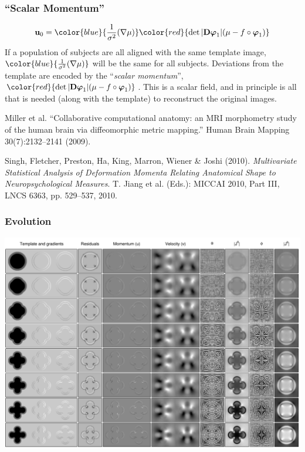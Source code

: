 \begin{frame}
\frametitle{``Scalar Momentum''}
\begin{eqnarray*}
{\bf u}_{0} = \color{blue}{\frac{1}{\sigma^2} (\nabla \mu)} \color{red}{\det | {\bf D}{\boldsymbol\varphi}_{1} | (\mu - f \circ {\boldsymbol\varphi}_1)}
\end{eqnarray*}
If a population of subjects are all aligned with the same template image, $\color{blue}{\frac{1}{\sigma^2} (\nabla \mu)}$ will be the same for all subjects.
Deviations from the template are encoded by the ``\emph{scalar momentum}'', $\color{red}{\det | {\bf D}{\boldsymbol\varphi}_{1} |(\mu - f \circ {\boldsymbol\varphi}_1)}$.
This is a scalar field, and in principle is all that is needed (along with the template) to reconstruct the original images.\par
\vspace{.25cm}
\begin{tiny}
Miller et al. ``Collaborative computational anatomy: an MRI morphometry study of the human brain via diffeomorphic metric mapping.'' Human Brain Mapping 30(7):2132--2141 (2009).\par
Singh, Fletcher, Preston, Ha, King, Marron, Wiener \& Joshi (2010). \emph{Multivariate Statistical Analysis of Deformation Momenta Relating Anatomical Shape to Neuropsychological Measures}. T. Jiang et al. (Eds.): MICCAI 2010, Part III, LNCS 6363, pp. 529--537, 2010.\par
\end{tiny}
\end{frame}

\begin{frame}
\frametitle{Evolution}
\begin{center}
\includegraphics[width=.9\textwidth]{evolution}
\end{center}
\end{frame}


